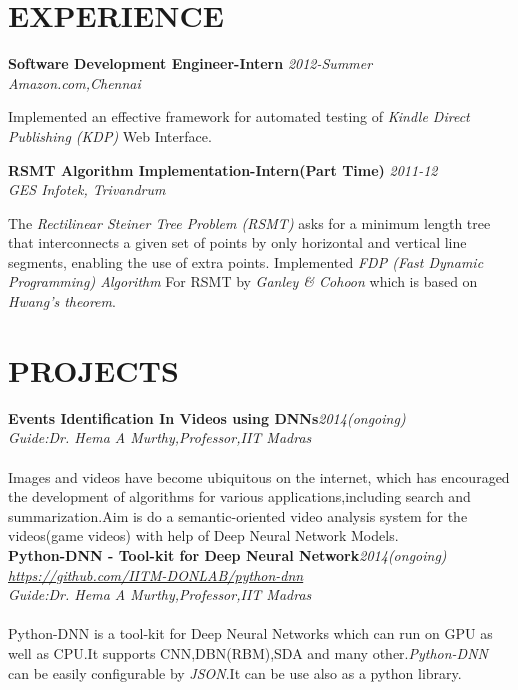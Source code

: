 \documentclass[line,margin]{res}
\begin{document}
\begin{resume}
  \section{EXPERIENCE}
  \textbf{ Software Development Engineer-Intern }\hfill \textit{2012-Summer } \\
  \textit{Amazon.com,Chennai }

  Implemented an effective framework for automated testing of \textit{Kindle Direct Publishing (KDP)} Web Interface.

  \textbf{ RSMT Algorithm Implementation-Intern(Part Time) }\hfill\textit{2011-12} \\
  \textit{GES Infotek, Trivandrum }

  The \textit{Rectilinear Steiner Tree Problem (RSMT)} asks for a minimum length tree that interconnects a given set of points by only horizontal and vertical line segments, enabling the use of extra points. Implemented \textit{FDP (Fast Dynamic Programming) Algorithm } For RSMT by \textit{Ganley \& Cohoon } which is based on \textit{Hwang’s theorem}.\\

  \pagebreak
  \section{PROJECTS}
  
  \textbf{Events Identification In Videos using DNNs}\hfill \textit{2014(ongoing)}\\
  \textit{Guide:Dr. Hema A Murthy,Professor,IIT Madras}\\\\
  Images and videos have become ubiquitous on the internet, which has encouraged the development of algorithms for various applications,including search and summarization.Aim is do a semantic-oriented video analysis system for the videos(game videos) with help of Deep Neural Network Models.\\

  \textbf{Python-DNN - Tool-kit for Deep Neural Network}\hfill \textit{2014(ongoing)}\\
  \textit{\url{https://github.com/IITM-DONLAB/python-dnn}}\\
  \textit{Guide:Dr. Hema A Murthy,Professor,IIT Madras}\\\\
  Python-DNN is a tool-kit for Deep Neural Networks which can run on GPU as well as CPU.It supports CNN,DBN(RBM),SDA and many other.\textit{Python-DNN} can be easily configurable by \textit{JSON}.It can be use also as a python library.\\\\


\end{resume}
\end{document}
